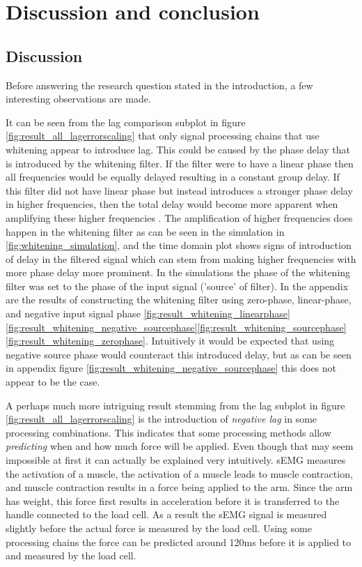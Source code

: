 \chapter{Discussion and conclusion}
\section{Discussion}
Before answering the research question stated in the introduction, a few interesting observations are made.

It can be seen from the lag comparison subplot in figure \ref{fig:result_all_lagerrorscaling} that only signal processing chains that use whitening appear to introduce lag. This could be caused by the phase delay that is introduced by the whitening filter. If the filter were to have a linear phase then all frequencies would be equally delayed resulting in a constant group delay. If this filter did not have linear phase but instead introduces a stronger phase delay in higher frequencies, then the total delay would become more apparent when amplifying these higher frequencies \cite{phase_delay_frequencies}. The amplification of higher frequencies does happen in the whitening filter as can be seen in the simulation in \ref{fig:whitening_simulation}, and the time domain plot shows signs of introduction of delay in the filtered signal which can stem from making higher frequencies with more phase delay more prominent. In the simulations the phase of the whitening filter was set to the phase of the input signal ('source' of filter). In the appendix are the results of constructing the whitening filter using zero-phase, linear-phase, and negative input signal phase \ref{fig:result_whitening_linearphase} \ref{fig:result_whitening_negative_sourcephase}\ref{fig:result_whitening_sourcephase}\ref{fig:result_whitening_zerophase}. Intuitively it would be expected that using negative source phase would counteract this introduced delay, but as can be seen in appendix figure \ref{fig:result_whitening_negative_sourcephase} this does not appear to be the case.

A perhaps much more intriguing result stemming from the lag subplot in figure \ref{fig:result_all_lagerrorscaling} is the introduction of \textit{negative lag} in some processing combinations. This indicates that some processing methods allow \textit{predicting} when and how much force will be applied. Even though that may seem impossible at first it can actually be explained very intuitively. sEMG measures the activation of a muscle, the activation of a muscle leads to muscle contraction, and muscle contraction results in a force being applied to the arm. Since the arm has weight, this force first results in acceleration before it is transferred to the handle connected to the load cell. As a result the sEMG signal is measured slightly before the actual force is measured by the load cell. Using some processing chains the force can be predicted around 120ms before it is applied to and measured by the load cell.

